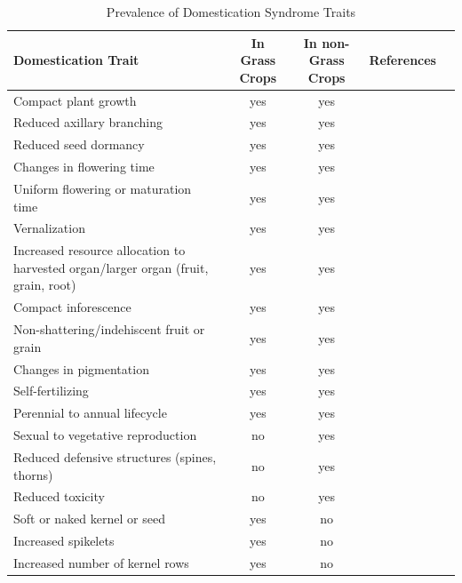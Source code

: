 \documentclass[12pt]{article}
\begin{document}
\begin{table}
\begin{center}
\caption{Prevalence of Domestication Syndrome Traits} \label{tab:DomTraits}
\begin{tabular}{p{5cm}cccl}\\\toprule  
{\bf Domestication Trait} & {\bf In Grass Crops} & {\bf In non-Grass Crops} &	{\bf References} \\\toprule
Compact plant growth & yes & yes & \citep{Gepts2010, Lenser2013}\\
Reduced axillary branching & yes & yes & \citep{Lenser2013}\\
Reduced seed dormancy & yes & yes & \citep{Gepts2010, FernndezMarn2014}\\
Changes in flowering time & yes & yes & \citep{Lenser2013}\\
Uniform flowering or maturation time & yes & yes & \citep{Lenser2013}\\
Vernalization & yes & yes & \citep{Blackman2016}\\
Increased resource allocation to harvested organ/larger organ (fruit, grain, root) & yes & yes & \citep{Miller2011}\\
Compact inforescence & yes & yes & \citep{Gepts2010, Greenwood2017}\\
Non-shattering/indehiscent fruit or grain & yes & yes & \citep{Lenser2013, Dong2014}\\
Changes in pigmentation & yes & yes & \citep{Lenser2013}\\
Self-fertilizing & yes & yes & \citep{Gepts2010}\\
Perennial to annual lifecycle  & yes & yes & \citep{Gepts2010, Miller2011}\\
Sexual to vegetative reproduction & no & yes & \citep{Lyu2017}\\
Reduced defensive structures (spines, thorns) & no & yes & \citep{Miller2011, Pickersgill2007}\\
Reduced toxicity & no & yes & \citep{Miller2011, Shlichta2018}\\
Soft or naked kernel or seed & yes & no & \citep{Wang2005}\\
Increased spikelets & yes & no & \citep{Gepts2010}\\
Increased number of kernel rows & yes & no & \citep{Lenser2013}\\\bottomrule
\end{tabular}
\end{center}
\end{table} 
 
\end{document}
